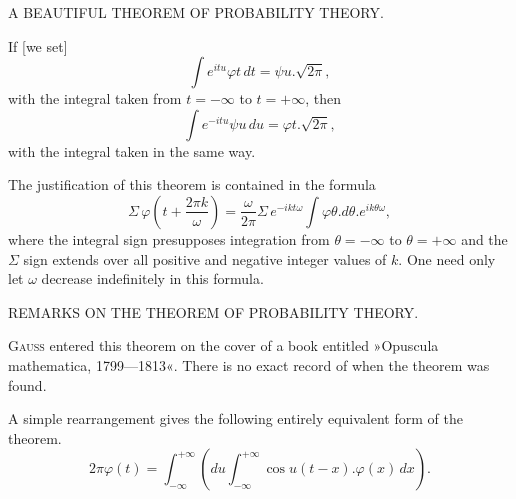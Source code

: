 \clearpage
{}%

\begin{center}
\large A BEAUTIFUL THEOREM OF PROBABILITY THEORY.
\end{center}

\noindent\hspace*{\parindent}If [we set]
\[
\int e^{itu}\varphi t\,dt = \psi u \mathord{.} \sqrt{2\pi},
\]
\noindent with the integral taken from $t=-\infty$ to $t=+\infty$, then
\[
\int e^{-itu}\psi u\,du = \varphi t \mathord{.} \sqrt{2\pi},
\]
\noindent with the integral taken in the same way.

The justification of this theorem is contained in the formula
\[
\Sigma\,\varphi\!\left(t+\frac{2\pi k}{\omega}\right) = \frac{\omega}{2\pi}\Sigma\, e^{-ikt\omega}\int \varphi\theta\mathord{.} d\theta\mathord{.} e^{ik\theta\omega},
\]
\noindent where the integral sign presupposes integration from $\theta=-\infty$ to $\theta=+\infty$ and the $\Sigma$ sign extends over all positive and negative integer values of $k$. One need only let $\omega$ decrease indefinitely in this formula.

\begin{center}
REMARKS ON THE THEOREM OF PROBABILITY THEORY.
\end{center}

\noindent\hspace*{\parindent}\textsc{Gauss} entered this theorem on the cover of a book entitled »Opuscula mathematica, 1799---1813«. There is no exact record of when the theorem was found.

A simple rearrangement gives the following entirely equivalent form of the theorem.
\[
2\pi\varphi(t) = \int^{+\infty}_{-\infty}\!\left(du\int^{+\infty}_{-\infty}\!\cos u(t-x)\mathord{.}\varphi(x)\,dx\right).
\]
